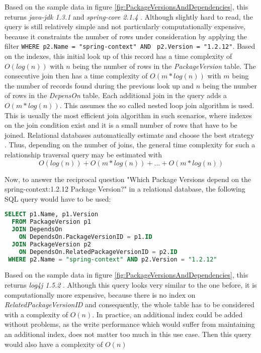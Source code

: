 Based on the sample data in figure \ref{fig:PackageVersionsAndDependencies}, this returns \emph{java-jdk 1.3.1} and \emph{spring-core 2.1.4} \cite{neo4j}. Although slightly hard to read, the query is still relatively simple and not particularly computationally expensive, because it constraints the number of rows under consideration by applying the filter \lstinline|WHERE p2.Name = "spring-context" AND | \lstinline|p2.Version = "1.2.12"|. Based on the indexes, this initial look up of this record has a time complexity of $O(log(n))$ with $n$ being the number of rows in the \emph{PackageVersion} table. The consecutive join then has a time complexity of $O(m*log(n))$ with $m$ being the number of records found during the previous look up and $n$ being the number of rows in the \emph{DepensOn} table. Each additional join in the query adds a $O(m*log(n))$. This assumes the so called nested loop join algorithm is used. This is usually the most efficient join algorithm in such scenarios, where indexes on the join condition exist and it is a small number of rows that have to be joined. Relational databases automatically estimate and choose the best strategy \cite{PostgreSQLJoin}. Thus, depending on the number of joins, the general time complexity for such a relationship traversal query may be estimated with
$$O(log(n)) + O(m*log(n)) + ... + O(m*log(n))$$ 

Now, to answer the reciprocal question "Which Package Versions depend on the spring-context:1.2.12 Package Version?" in a relational database, the following SQL query would have to be used:

\begin{lstlisting}[language=SQL, caption=Package Version Reciprocal Dependencies, captionpos=b, label=lst:PackageVersionReciprocalDependencies]
SELECT p1.Name, p1.Version
  FROM PackageVersion p1 
  JOIN DependsOn
    ON DependsOn.PackageVersionID = p1.ID
  JOIN PackageVersion p2
    ON DependsOn.RelatedPackageVersionID = p2.ID
 WHERE p2.Name = "spring-context" AND p2.Version = "1.2.12"
\end{lstlisting}

Based on the sample data in figure \ref{fig:PackageVersionsAndDependencies}, this returns \emph{log4j 1.5.2} \cite{neo4j}. Although this query looks very similar to the one before, it is computationally more expensive, because there is no index on \emph{RelatedPackageVersionID} and consequently, the whole table has to be considered with a complexity of $O(n)$. In practice, an additional index could be added without problems, as the write performance which would suffer from maintaining an additional index, does not matter too much in this use case. Then this query would also have a complexity of $O(n)$\\

